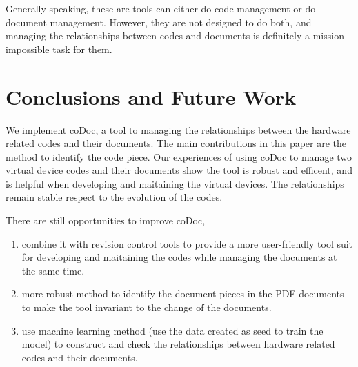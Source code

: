 \documentclass[11pt,letterpaper,oneside]{article}
\begin{document}
Generally speaking, these are tools can either do code management or do document management.
However, they are not designed to do both,
and managing the relationships between codes and documents is definitely a mission impossible task for them.


\section{Conclusions and Future Work}
\label{sec:conclusion}
We implement coDoc, 
a tool to managing the relationships between the hardware related codes and their documents.
The main contributions in this paper are the method to identify the code piece.
Our experiences of using coDoc to manage two virtual device codes and their documents show the tool is robust and efficent,
and is helpful when developing and maitaining the virtual devices.
The relationships remain stable respect to the evolution of the codes.

There are still opportunities to improve coDoc, 
\begin{enumerate}
\item combine it with revision control tools to provide a more user-friendly tool suit for developing and maitaining the codes while managing the documents at the same time.
\item more robust method to identify the document pieces in the PDF documents to make the tool invariant to the change of the documents.
\item use machine learning method (use the data created as seed to train the model) to construct and check the relationships between hardware related codes and their documents.
\end{enumerate}






\end{document}
